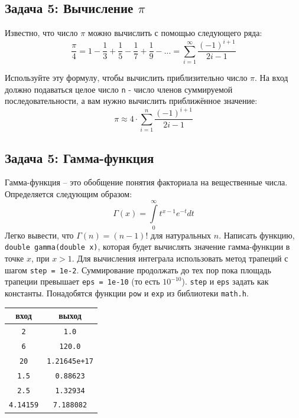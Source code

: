 \documentclass{article}
\begin{document}
\subsection*{Задача 5: Вычисление $\pi$} 
Известно, что число $\pi$ можно вычислить с помощью следующего ряда:
$$
\frac{\pi}{4} = 1 - \frac{1}{3} + \frac{1}{5} - \frac{1}{7} + \frac{1}{9} - ... = \sum_{i=1}^{\infty} \frac{(-1)^{i + 1}}{2i-1}
$$

Используйте эту формулу, чтобы вычислить приблизительно число $\pi$. На вход должно подаваться целое число \texttt{n} - число членов суммируемой последовательности, а вам нужно вычислить приближённое значение:
$$
\pi \approx 4 \cdot \sum_{i=1}^{n} \frac{(-1)^{i + 1}}{2i-1}
$$



\subsection*{Задача 5: Гамма-функция} 
Гамма-функция -- это обобщение понятия факториала на вещественные числа. Определяется следующим образом:
$$
\Gamma \left( x \right) = \int\limits_0^\infty {t^{x - 1} e^{ - t} dt}
$$
Легко вывести, что $\Gamma(n) = (n - 1)!$ для натуральных $n$. Написать функцию, \texttt{double gamma(double x)}, которая будет вычислять значение гамма-функции в точке $x$, при $x > 1$. Для вычисления интеграла использовать метод трапеций с шагом \texttt{step = 1e-2}. Суммирование продолжать до тех пор пока площадь трапеции превышает \texttt{eps = 1e-10} (то есть $10 ^{-10}$). \texttt{step} и \texttt{eps} задать как константы. Понадобятся функции \texttt{pow} и \texttt{exp} из библиотеки \texttt{math.h}.

\begin{center}
\begin{tabular}{ c c }
 вход & выход \\ \hline
 \texttt{2} & \texttt{1.0}  \\ 
 \texttt{6} & \texttt{120.0}  \\
 \texttt{20} & \texttt{1.21645e+17}  \\
 \texttt{1.5} &        \texttt{0.88623} \\
 \texttt{2.5} &        \texttt{1.32934}\\
 \texttt{4.14159} & \texttt{7.188082}\\
\end{tabular}
\end{center}
\end{document}
